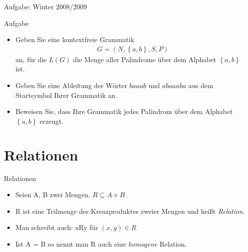 \begin{frame}{Aufgabe: Winter 2008/2009}
    \begin{exampleblock}{Aufgabe}
        \begin{itemize}
            \item Geben Sie eine kontextfreie Grammatik 
                \begin{align*}
                    G = \left( N,\left\{ a,b\right\} ,S,P\right) 
                \end{align*}
                an, für die $L\left( G\right) $ die Menge aller Palindrome über dem Alphabet $\left\{ a,b\right\} $ ist. 
            \item Geben Sie eine Ableitung der Wörter $baaab$ und $abaaaba$ aus dem Startsymbol Ihrer Grammatik an. 
            \item Beweisen Sie, dass Ihre Grammatik jedes Palindrom über dem Alphabet $\left\{ a, b\right\} $ erzeugt.
        \end{itemize}
    \end{exampleblock}
\end{frame}

\section{Relationen}
\begin{frame}{Relationen}
  \begin{definition}
    \begin{itemize}
      \item Seien A, B zwei Mengen. $ R \subseteq A \times B $\pause
      \item R ist eine Teilmenge des Kreuzproduktes zweier Mengen und heißt \emph{Relation}.\pause
      \item Man schreibt auch: xRy für $(x, y) \in R$\pause
      \item Ist A = B so nennt man R auch eine \emph{homogene} Relation.\pause
    \end{itemize}
  \end{definition}
\end{frame}

